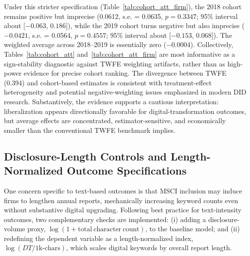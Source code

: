 Under this stricter specification (Table~\ref{tab:cohort_att_firm}), the 2018 cohort remains positive but imprecise (0.0612, s.e. = 0.0635, $p = 0.3347$; 95\% interval about [$-0.063$, $0.186$]), while the 2019 cohort turns negative but also imprecise ($-0.0421$, s.e. = 0.0564, $p = 0.4557$; 95\% interval about [$-0.153$, $0.068$]). The weighted average across 2018--2019 is essentially zero ($-0.0004$). Collectively, Tables~\ref{tab:cohort_att} and~\ref{tab:cohort_att_firm} are most informative as a sign-stability diagnostic against TWFE weighting artifacts, rather than as high-power evidence for precise cohort ranking. The divergence between TWFE (0.394) and cohort-based estimates is consistent with treatment-effect heterogeneity and potential negative-weighting issues emphasized in modern DID research. Substantively, the evidence supports a cautious interpretation: liberalization appears directionally favorable for digital-transformation outcomes, but average effects are concentrated, estimator-sensitive, and economically smaller than the conventional TWFE benchmark implies.

\subsection{Disclosure-Length Controls and Length-Normalized Outcome Specifications}

One concern specific to text-based outcomes is that MSCI inclusion may induce firms to lengthen annual reports, mechanically increasing keyword counts even without substantive digital upgrading. Following best practice for text-intensity outcomes, two complementary checks are implemented: (i) adding a disclosure-volume proxy, $\log(1+\mathrm{total\ character\ count})$, to the baseline model; and (ii) redefining the dependent variable as a length-normalized index, $\log(DT/\mathrm{1k\text{-}chars})$, which scales digital keywords by overall report length.

